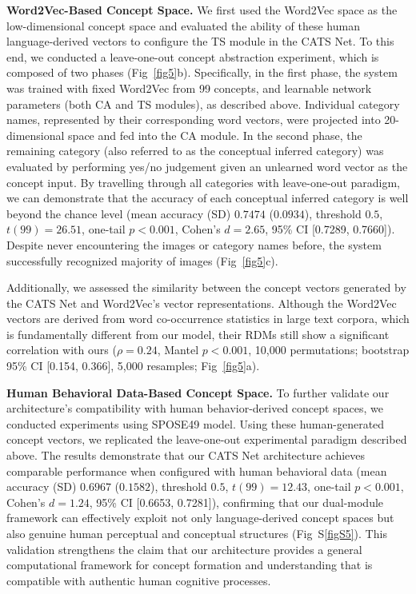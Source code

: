 \documentclass[pdflatex,sn-mathphys-num,lineno]{sn-jnl}%
\begin{document}
\begin{CJK}{UTF8}{gbsn}
\textbf{Word2Vec-Based Concept Space.} We first used the Word2Vec space as the low-dimensional concept space and evaluated the ability of these human language-derived vectors to configure the TS module in the CATS Net. To this end, we conducted a leave-one-out concept abstraction experiment, which is composed of two phases (Fig~\ref{fig5}b). Specifically, in the first phase, the system was trained with fixed Word2Vec from 99 concepts, and learnable network parameters (both CA and TS modules), as described above. Individual category names, represented by their corresponding word vectors, were projected into 20-dimensional space and fed into the CA module. In the second phase, the remaining category (also referred to as the conceptual inferred category) was evaluated by performing yes/no judgement given an unlearned word vector as the concept input. By travelling through all categories with leave-one-out paradigm, we can demonstrate that the accuracy of each conceptual inferred category is well beyond the chance level (mean accuracy (SD) $0.7474$ ($0.0934$), threshold $0.5$, $t(99)=26.51$, one-tail $p < 0.001$, Cohen's $d = 2.65$, 95\% CI [0.7289, 0.7660]). Despite never encountering the images or category names before, the system successfully recognized majority of images (Fig~\ref{fig5}c).

Additionally, we assessed the similarity between the concept vectors generated by the CATS Net and Word2Vec's vector representations. Although the Word2Vec vectors are derived from word co-occurrence statistics in large text corpora, which is fundamentally different from our model, their RDMs still show a significant correlation with ours ($\rho=0.24$, Mantel $p < 0.001$, 10,000 permutations; bootstrap 95\% CI [0.154, 0.366], 5,000 resamples; Fig~\ref{fig5}a). 

\textbf{Human Behavioral Data-Based Concept Space.} To further validate our architecture's compatibility with human behavior-derived concept spaces, we conducted experiments using SPOSE49 model. Using these human-generated concept vectors, we replicated the leave-one-out experimental paradigm described above. The results demonstrate that our CATS Net architecture achieves comparable performance when configured with human behavioral data (mean accuracy (SD) $0.6967$ ($0.1582$), threshold $0.5$, $t(99)=12.43$, one-tail $p < 0.001$, Cohen's $d = 1.24$, 95\% CI [0.6653, 0.7281]), confirming that our dual-module framework can effectively exploit not only language-derived concept spaces but also genuine human perceptual and conceptual structures (Fig~S\ref{figS5}). This validation strengthens the claim that our architecture provides a general computational framework for concept formation and understanding that is compatible with authentic human cognitive processes.


\end{CJK}
\end{document}
